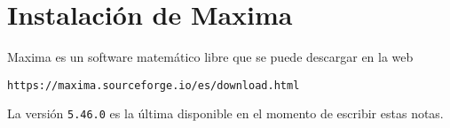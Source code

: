 
\section*{Instalación de Maxima}
Maxima es un software matemático libre
que se puede descargar en la web
\begin{center}
\verb|https://maxima.sourceforge.io/es/download.html|
\end{center}
La versión \texttt{5.46.0} es la última disponible
en el momento de escribir estas notas.
